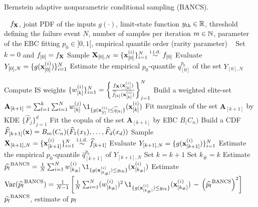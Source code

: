 \begin{algorithm}[h]
    \caption{Bernstein adaptive nonparametric conditional sampling (BANCS).}\label{alg:bancs}
    \footnotesize
    \begin{algorithmic}[1]
        \State {}\hfill~
        \State $f_{\bf X}$, joint PDF of the inputs
        \State $g(\cdot)$, limit-state function
        \State $y_\mathrm{th} \in \mathbb{R}$, threshold defining the failure event 
        \State $N$, number of samples per iteration
        \State $m \in \mathbb{N}$, parameter of the EBC fitting
        \State $p_0 \in ]0, 1[$, empirical quantile order (rarity parameter)
        \State {}\hfill~
        \State Set $k = 0$ and $f_{[0]} = f_{\bf X}$
        \State Sample ${\bf X}_{[0], N} = \{{\bf x}_{[0]}^{(i)}\}_{i=1}^N \overset{\text{i.i.d.}}{\sim} f_{[0]}$
        \State Evaluate $Y_{[0], N} = \{g({\bf x}_{[0]}^{(i)})\}_{i=1}^N$
        \State Estimate the empirical $p_0$-quantile $\widehat{q}_{[0]}^{p_0}$ of the set $Y_{[0], N}$
        
        \State Compute IS weights $\{w_{[k]}^{(i)}\}_{i=1}^N = \left\{\frac{f_{\bf X}({\bf x}_{[k]}^{(i)})}{\widehat{f}_{[k]}({\bf x}_{[k]}^{(i)})}\right\}_{j=1}^N$
        \State Build a weighted elite-set $\mathbf{A}_{[k+1]}=\sum_{l=1}^{k} \sum_{i=1}^N w_{[k]}^{(j)} \, \1_{\{g(\bx_{[l]}^{(i)}) \leq \widehat{q}_{[k]} \}}(\bx_{[k]}^{(i)})$
        \State Fit marginals of the set $\mathbf{A}_{[k+1]}$ by KDE $\{\widehat{F}_j\}_{j=1}^d$
        \State Fit the copula of the set $\mathbf{A}_{[k+1]}$ by EBC $B_\bm(C_n)$
        \State Build a CDF $\widehat{F}_{[k+1]}({\bf x}) = B_m(C_n)(\widehat{F}_1(x_1), \dots, \widehat{F}_d(x_d))$
        \State Sample ${\bf X}_{[k+1], N} = \{{\bf x}_{[k+1]}^{(i)}\}_{i=1}^N \overset{\text{i.i.d.}}{\sim} \widehat{f}_{[k+1]}$
        \State Evaluate $Y_{[k+1], N} = \{g({\bf x}_{[k+1]}^{(i)})\}_{i=1}^N$
        \State Estimate the empirical $p_0$-quantile $\widehat{q}_{[k+1]}^{p_0}$ of $Y_{[k+1], N}$
\State Set $k = k+1$
\EndWhile
\State Set $k_\# = k$
\State Estimate $\widehat{\pf}^{\mathrm{BANCS}} = \frac1N \sum_{i=1}^N w_{[k_\#]}^{(i)} \, \1_{\{g(\bx_{[k_\#]}^{(i)}) \leq \yth \}}(\bx_{[k_\#]}^{(i)})$
\State Estimate $\var(\widehat{\pf}^{\mathrm{BANCS}}) = \frac{1}{N-1} \left[\frac1N \sum_{i=1}^N (w_{[k_\#]}^{(i)})^2 \, \1_{\{g(\bx_{[k_\#]}^{(i)}) \leq \yth \}}(\bx_{[k_\#]}^{(i)}) \, - \, \left(\widehat{\pf}^{\mathrm{BANCS}}\right)^2\right]$
\State {}\hfill~
\State $\widehat{p_\mathrm{f}}^{\mathrm{BANCS}}$, estimate of $p_\mathrm{f}$
\end{algorithmic}
\end{algorithm}
